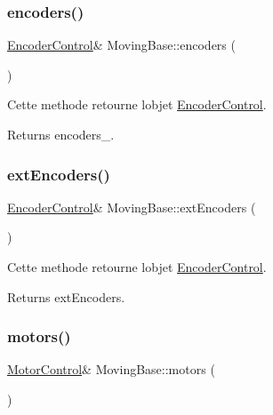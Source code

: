 \subsubsection{\texorpdfstring{encoders()}{encoders()}}
{\footnotesize\ttfamily \hyperlink{classEncoderControl}{Encoder\+Control}\& Moving\+Base\+::encoders (\begin{DoxyParamCaption}{ }\end{DoxyParamCaption})\hspace{0.3cm}{\ttfamily [inline]}}



Cette methode retourne l\textquotesingle{}objet \hyperlink{classEncoderControl}{Encoder\+Control}. 

\begin{DoxyReturn}{Returns}
encoders\+\_\+. 
\end{DoxyReturn}
\mbox{\label{classMovingBase_aede235e6b3c7379d472fad26b6f5655d}} 
\subsubsection{\texorpdfstring{ext\+Encoders()}{extEncoders()}}
{\footnotesize\ttfamily \hyperlink{classEncoderControl}{Encoder\+Control}\& Moving\+Base\+::ext\+Encoders (\begin{DoxyParamCaption}{ }\end{DoxyParamCaption})\hspace{0.3cm}{\ttfamily [inline]}}



Cette methode retourne l\textquotesingle{}objet \hyperlink{classEncoderControl}{Encoder\+Control}. 

\begin{DoxyReturn}{Returns}
ext\+Encoders. 
\end{DoxyReturn}
\mbox{\label{classMovingBase_a72c9d1576dd5305462f518d149d19c37}} 
\subsubsection{\texorpdfstring{motors()}{motors()}}
{\footnotesize\ttfamily \hyperlink{classMotorControl}{Motor\+Control}\& Moving\+Base\+::motors (\begin{DoxyParamCaption}{ }\end{DoxyParamCaption})\hspace{0.3cm}{\ttfamily [inline]}}



